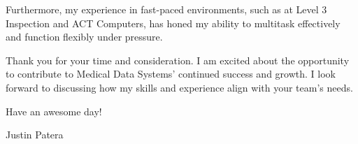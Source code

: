 \smallskip

Furthermore, my experience in fast-paced environments, such as at Level 3 Inspection and ACT Computers, has honed my ability to multitask effectively and function flexibly under pressure.

\smallskip

Thank you for your time and consideration.
I am excited about the opportunity to contribute to Medical Data Systems' continued success and growth.
I look forward to discussing how my skills and experience align with your team's needs.

\smallskip

Have an awesome day!

\smallskip

Justin Patera

